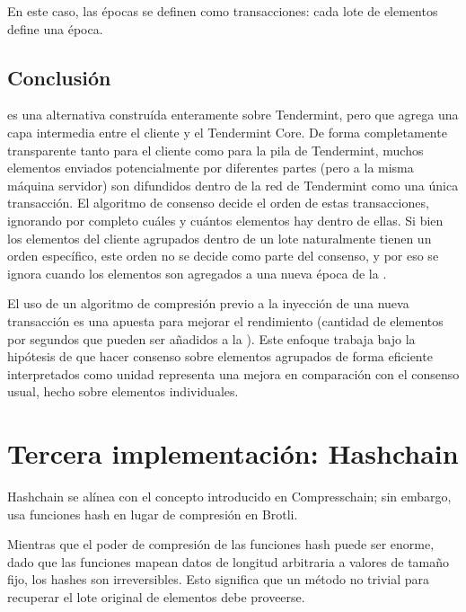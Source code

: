 %
En este caso, las épocas se definen como transacciones: cada lote de elementos define una época.


\subsection{Conclusión}
\compresschain es una alternativa construída enteramente sobre Tendermint, pero que agrega una capa
intermedia entre el cliente y el Tendermint Core.
De forma completamente transparente tanto para el
cliente como para la pila de Tendermint, muchos elementos enviados potencialmente por diferentes partes
(pero a la misma máquina servidor)
son difundidos dentro de la red de Tendermint como una única transacción.
El algoritmo de consenso
decide el orden de estas transacciones, ignorando por completo cuáles y cuántos elementos hay dentro de ellas.
Si bien los elementos del cliente agrupados dentro de un lote naturalmente tienen un orden específico,
este orden no se decide como parte del consenso, y por eso se ignora cuando los elementos son agregados
a una nueva época de la \setchain.

%

El uso de un algoritmo de compresión previo a la inyección de una nueva transacción es una apuesta para mejorar
el rendimiento (cantidad de elementos por segundos que pueden ser añadidos a la \setchain).
Este enfoque trabaja bajo la hipótesis
de que hacer consenso sobre elementos agrupados de forma eficiente interpretados como unidad representa una
mejora en comparación con el consenso usual, hecho sobre elementos individuales.

\section{Tercera implementación: Hashchain}\label{subsec:hashchain}
%
Hashchain se alínea con el concepto introducido en Compresschain; sin embargo, usa
funciones hash en lugar de compresión en Brotli.

%
Mientras que el poder de compresión de las funciones hash puede ser enorme, dado que las funciones
mapean datos de longitud arbitraria a valores de tamaño fijo, los hashes son irreversibles. Esto
significa que un método no trivial para recuperar el lote original de elementos debe proveerse.

